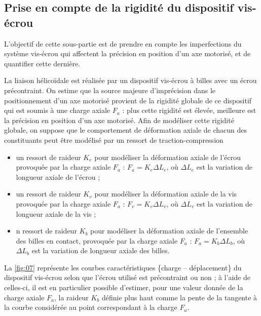 \subsection{Prise en compte de la rigidité du dispositif vis-écrou}
\begin{obj}
L’objectif de cette sous-partie est de prendre en compte les imperfections du système vis-écrou qui
affectent la précision en position d’un axe motorisé, et de quantifier cette dernière.
\end{obj}

La liaison hélicoïdale est réalisée par un dispositif vis-écrou à billes avec un écrou précontraint. On estime que
la source majeure d’imprécision dans le positionnement d’un axe motorisé provient de la rigidité globale de
ce dispositif qui est soumis à une charge axiale $F_a$ : plus cette rigidité est élevée, meilleure est la précision
en position d’un axe motorisé. Afin de modéliser cette rigidité globale, on suppose que le comportement de
déformation axiale de chacun des constituants peut être modélisé par un ressort de traction-compression
\begin{itemize}
\item un ressort de raideur $K_e$ pour modéliser la déformation axiale de l’écrou provoquée par la charge axiale
$F_a$ : $F_a = K_e \Delta L_e$,  où $\Delta L_e$ est la variation de longueur axiale de l’écrou ;
\item un ressort de raideur $K_v$ pour modéliser la déformation axiale de la vis provoquée par la charge axiale $F_a$ : $F_v = K_v \Delta L_v$,  où $\Delta L_v$ est la variation de longueur axiale de la vis ;
\item n ressort de raideur $K_b$ pour modéliser la déformation axiale de l’ensemble des billes en contact, provoquée par la charge axiale $F_a$ : $F_a = K_b \Delta L_b$,  où $\Delta L_b$ est la variation de longueur axiale des billes.
\end{itemize}

\ifprof
\begin{corrige}
\end{corrige}
\else
\fi

La \autoref{fig:07} représente les courbes caractéristiques \{charge -- déplacement\} du dispositif vis-écrou selon que l’écrou utilisé est précontraint ou non ; à l’aide de celles-ci, il est en particulier possible d’estimer, pour une
valeur donnée de la charge axiale $F_a$, la raideur $K_b$ définie plus haut comme la pente de la tangente à la courbe considérée au point correspondant à la charge $F_a$.


